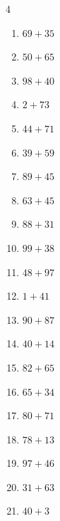 \begin{multicols}{4}
\begin{enumerate}
  \item $69+35$
        \phantom{$=104$}

  \item $50+65$
        \phantom{$=115$}

\columnbreak %

  \item $98+40$
        \phantom{$=138$}

  \item $2+73$
        \phantom{$=75$}

  \item $44+71$
        \phantom{$=115$}

  \item $39+59$
        \phantom{$=98$}

  \item $89+45$
        \phantom{$=134$}

  \item $63+45$
        \phantom{$=108$}

  \item $88+31$
        \phantom{$=119$}

  \item $99+38$
        \phantom{$=137$}

  \item $48+97$
        \phantom{$=145$}

  \item $1+41$
        \phantom{$=42$}

  \item $90+87$
        \phantom{$=177$}

  \item $40+14$
        \phantom{$=54$}

  \item $82+65$
        \phantom{$=147$}

  \item $65+34$
        \phantom{$=99$}

  \item $80+71$
        \phantom{$=151$}

  \item $78+13$
        \phantom{$=91$}

  \item $97+46$
        \phantom{$=143$}

  \item $31+63$
        \phantom{$=94$}

  \item $40+3$
        \phantom{$=43$}


\end{enumerate}
\end{multicols}
